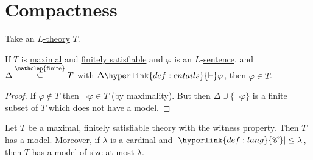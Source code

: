 \documentclass{article}
\newcommand{\named}[1]{\textbf{#1}\index{#1}}
\begin{document}
\section{Compactness}
\begin{ndef}\label{def:5.1}
  Take an \hyperlink{def:ltheory}{$L$-theory} $T$.
\end{ndef}
\begin{nlemma}\label{lem:5.2}
  If $T$ is \hyperlink{def:maximal}{maximal} and \hyperlink{def:fs}{finitely satisfiable} and $\varphi$ is an $L$-\hyperlink{def:sentence}{sentence}, and $\Delta \overset{\mathclap{\text{finite}}}\subseteq T$ with $\Delta \hyperlink{def:entails}{\vdash} \varphi$, then $\varphi \in T$.
\end{nlemma}
\begin{proof}
  If $\varphi \notin T$ then $\neg \varphi \in T$ (by maximality).
  But then $\Delta \cup \{\neg \varphi\}$ is a finite subset of $T$ which does not have a model.
\end{proof}
\begin{nlemma}\label{lem:5.3}
  Let $T$ be a \hyperlink{def:maximal}{maximal}, \hyperlink{def:fs}{finitely satisfiable} theory with the \hyperlink{def:wp}{witness property}.
  Then $T$ has a \hyperlink{def:model}{model}.
  Moreover, if $\lambda$ is a cardinal and $|\hyperlink{def:lang}{\mathscr{C}}| \leq \lambda$, then $T$ has a model of size at most $\lambda$.
\end{nlemma}
\end{document}
